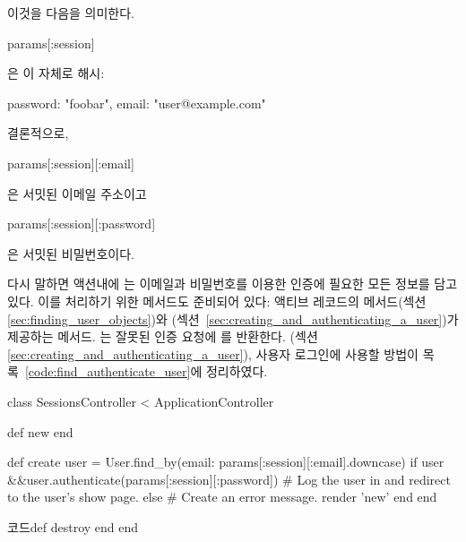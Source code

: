 \noindent 이것을 다음을 의미한다. 

\begin{code} params[:session] \end{code} 

\noindent 은 이 자체로 해시: 

\begin{code} { password: "foobar", email: "user@example.com" } \end{code} 

\noindent 결론적으로, 

\begin{code} params[:session][:email] \end{code} 

\noindent 은 서밋된 이메일 주소이고 

\begin{code} params[:session][:password] \end{code} 

\noindent 은 서밋된 비밀번호이다. 

다시 말하면  액션내에 는 이메일과 비밀번호를 이용한 인증에 필요한 모든 정보를 담고 있다. 이를 처리하기 위한 메서드도 준비되어 있다: 액티브 레코드의  메서드(섹션 \ref{sec:finding_user_objects})와  (섹션~\ref{sec:creating_and_authenticating_a_user})가 제공하는  메서드. 는 잘못된 인증 요청에 를 반환한다. (섹션 \ref{sec:creating_and_authenticating_a_user}), 사용자 로그인에 사용할 방법이 목록~\ref{code:find_authenticate_user}에 정리하였다. 

\begin{codelisting} \label{code:find_authenticate_user}  

\begin{code} class SessionsController < ApplicationController 

def new end 

def create user = User.find_by(email: params[:session][:email].downcase) if user &&user.authenticate(params[:session][:password]) # Log the user in and redirect to the user's show page. else # Create an error message. render 'new' end end 

코드def destroy end end \end{code} \end{codelisting} 

